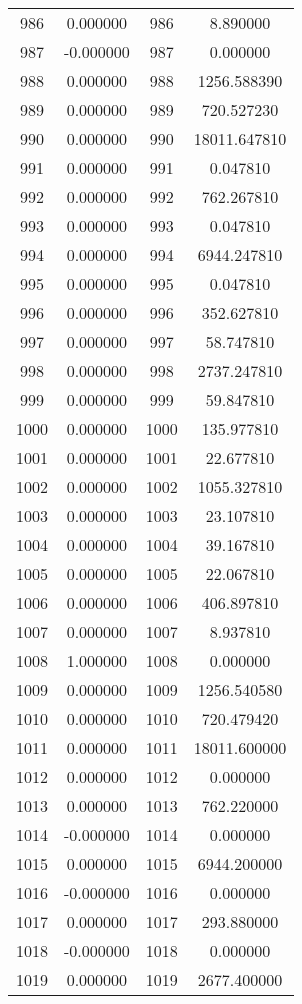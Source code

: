 \documentclass[12pt]{article}
\begin{document}
\begin{longtable}{@{}cccc@{}}
986 & 0.000000 & 986 & 8.890000 \\
987 & -0.000000 & 987 & 0.000000 \\
988 & 0.000000 & 988 & 1256.588390 \\
989 & 0.000000 & 989 & 720.527230 \\
990 & 0.000000 & 990 & 18011.647810 \\
991 & 0.000000 & 991 & 0.047810 \\
992 & 0.000000 & 992 & 762.267810 \\
993 & 0.000000 & 993 & 0.047810 \\
994 & 0.000000 & 994 & 6944.247810 \\
995 & 0.000000 & 995 & 0.047810 \\
996 & 0.000000 & 996 & 352.627810 \\
997 & 0.000000 & 997 & 58.747810 \\
998 & 0.000000 & 998 & 2737.247810 \\
999 & 0.000000 & 999 & 59.847810 \\
1000 & 0.000000 & 1000 & 135.977810 \\
1001 & 0.000000 & 1001 & 22.677810 \\
1002 & 0.000000 & 1002 & 1055.327810 \\
1003 & 0.000000 & 1003 & 23.107810 \\
1004 & 0.000000 & 1004 & 39.167810 \\
1005 & 0.000000 & 1005 & 22.067810 \\
1006 & 0.000000 & 1006 & 406.897810 \\
1007 & 0.000000 & 1007 & 8.937810 \\
1008 & 1.000000 & 1008 & 0.000000 \\
1009 & 0.000000 & 1009 & 1256.540580 \\
1010 & 0.000000 & 1010 & 720.479420 \\
1011 & 0.000000 & 1011 & 18011.600000 \\
1012 & 0.000000 & 1012 & 0.000000 \\
1013 & 0.000000 & 1013 & 762.220000 \\
1014 & -0.000000 & 1014 & 0.000000 \\
1015 & 0.000000 & 1015 & 6944.200000 \\
1016 & -0.000000 & 1016 & 0.000000 \\
1017 & 0.000000 & 1017 & 293.880000 \\
1018 & -0.000000 & 1018 & 0.000000 \\
1019 & 0.000000 & 1019 & 2677.400000 \\

\end{longtable}
\end{document}
